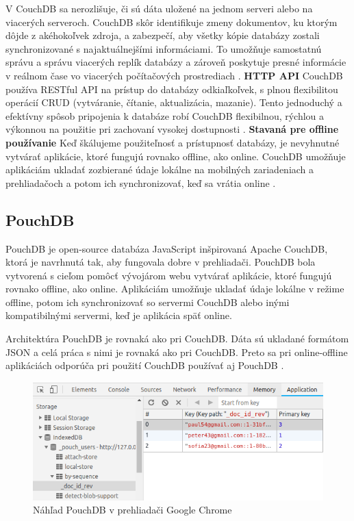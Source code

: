 \indent V CouchDB sa nerozlišuje, či sú dáta uložené na jednom serveri alebo na viacerých serveroch. CouchDB skôr identifikuje zmeny dokumentov, ku ktorým dôjde z akéhokoľvek zdroja, a zabezpečí, aby všetky kópie databázy zostali synchronizované s najaktuálnejšími informáciami. To umožňuje samostatnú správu a správu viacerých replík databázy a zároveň poskytuje presné informácie v reálnom čase vo viacerých počítačových prostrediach \cite{coucdb}.\newpage
\noindent\textbf{HTTP API} \newline
\indent CouchDB používa RESTful API na prístup do databázy odkiaľkoľvek, s plnou flexibilitou operácií CRUD (vytváranie, čítanie, aktualizácia, mazanie). Tento jednoduchý a efektívny spôsob pripojenia k databáze robí CouchDB flexibilnou, rýchlou a výkonnou na použitie pri zachovaní vysokej dostupnosti \cite{coucdb}.\newline
\textbf{Stavaná pre offline používanie} \newline
\indent Keď škálujeme použiteľnosť a prístupnosť databázy, je nevyhnutné vytvárať aplikácie, ktoré fungujú rovnako offline, ako online. CouchDB umožňuje aplikáciám ukladať zozbierané údaje lokálne na mobilných zariadeniach a prehliadačoch a potom ich synchronizovať, keď sa vrátia online \cite{coucdb}.

\subsection{PouchDB}
\indent PouchDB je open-source databáza JavaScript inšpirovaná Apache CouchDB, ktorá je navrhnutá tak, aby fungovala dobre v prehliadači. PouchDB bola vytvorená s cieľom pomôcť vývojárom webu vytvárať aplikácie, ktoré fungujú rovnako offline, ako online. Aplikáciám umožňuje ukladať údaje lokálne v režime offline, potom ich synchronizovať so servermi CouchDB alebo inými kompatibilnými servermi, keď je aplikácia späť online.

\indent Architektúra PouchDB je rovnaká ako pri CouchDB. Dáta sú ukladané formátom JSON a celá práca s nimi je rovnaká ako pri CouchDB. Preto sa pri online-offline aplikáciách odporúča pri použití CouchDB používať aj PouchDB \cite{poucdb}.

\begin{figure}[H]
    \centering
    \includegraphics[scale=0.80]{img/pouchdb.png}
    \caption{Náhľad PouchDB v prehliadači Google Chrome \cite{poucdb}}
    \label{fig:pouch_db}
\end{figure}

